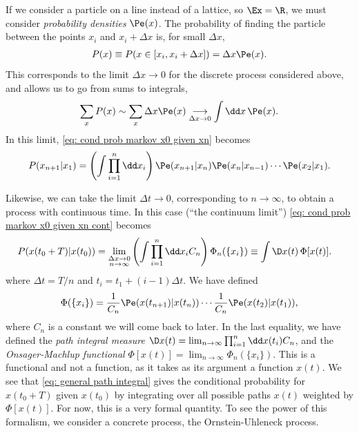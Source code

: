 If we consider a particle on a line instead of a lattice, so $\Ex = \R$, we must consider \emph{probability densities} $\Pe(x)$.
The probability of finding the particle between the points $x_i$ and $x_i + \Delta x$ is, for small $\Delta x$,
%
\begin{align}
    P(x) \equiv P(x \in [x_i, x_i + \Delta x]) = \Delta x \Pe(x).
\end{align}
%
This corresponds to the limit $\Delta x \rightarrow 0$ for the discrete process considered above, and allows us to go from sums to integrals,
%
\begin{align}
    \sum_{x} P(x) \sim \sum_{x} \Delta x \Pe(x) \underset{\Delta x \rightarrow 0}{\longrightarrow} \int \dd x \, \Pe(x).
\end{align}
%
In this limit, \autoref{eq: cond prob markov x0 given xn} becomes
%
\begin{align}\label{eq: cond prob markov x0 given xn cont}
    P(x_{n+1}|x_1) 
    = \left(\int \prod_{i=1}^{n} \dd x_i\right)
    \Pe(x_{n+1}|x_n) \Pe(x_n| x_{n-1})\cdots \Pe(x_2|x_1).
\end{align}

Likewise, we can take the limit $\Delta t\rightarrow 0$, corresponding to $n\rightarrow\infty$, to obtain a process with continuous time.
In this case (``the continuum limit'') \autoref{eq: cond prob markov x0 given xn cont} becomes
%
\begin{align}\label{eq: general path integral}
    P(x(t_0 + T) | x(t_0) ) 
    &
    =
    \lim_{
        \substack{\Delta x \rightarrow 0\\n\rightarrow \infty}
    }
    \left(\int \prod_{i = 1}^{n} \dd x_i C_n\right)
    \Phi_n(\{x_i\})
    \equiv
    \int \D x(t) \, \Phi[x(t)].
\end{align}
%
where $\Delta t = T/n$ and $t_i = t_1 + (i-1)\Delta t$.
We have defined 
%
\begin{align}
    \Phi(\{x_i\}) = \frac{1}{C_n} \Pe(x(t_{n+1}) | x(t_n) ) \cdots \frac{1}{C_n} \Pe(x(t_{2}) | x(t_1) ),
\end{align}
%
where $C_n$ is a constant we will come back to later.
In the last equality, we have defined the \emph{path integral measure} $\D x(t) = \lim_{n \rightarrow \infty} \prod_{i=1}^n \dd x(t_i) C_n$,
and the \emph{Onsager-Machlup functional} $\Phi[x(t)]= \lim_{n \rightarrow \infty} \Phi_n(\{x_i\})$.
This is a functional and not a function, as it takes as its argument a function $x(t)$.
We see that \autoref{eq: general path integral} gives the conditional probability for $x(t_0 + T)$ given $x(t_0)$ by integrating over all possible paths $x(t)$ weighted by $\Phi[x(t)]$.
For now, this is a very formal quantity.
To see the power of this formalism, we consider a concrete process, the Ornstein-Uhleneck process.



